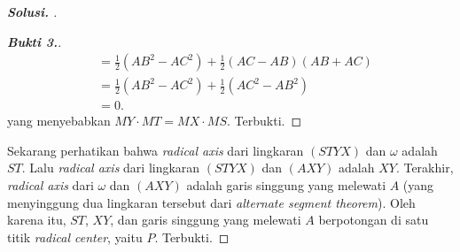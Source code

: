 \begin{proof}[\textbf{Solusi. }]
\begin{proof}[\textbf{Bukti 3.}]
\begin{align*}
            &= \frac12(AB^2-AC^2) + \frac12(AC-AB)(AB+AC)\\
            &= \frac12(AB^2-AC^2) + \frac12(AC^2-AB^2)\\
            &= 0.
        \end{align*}
        yang menyebabkan $MY \cdot MT = MX \cdot MS$. Terbukti.
    \end{proof} 
    Sekarang perhatikan bahwa \textit{radical axis} dari lingkaran $(STYX)$ dan $\omega$ adalah $ST$. 
    Lalu \textit{radical axis} dari lingkaran $(STYX)$ dan $(AXY)$ adalah $XY$. 
    Terakhir, \textit{radical axis} dari $\omega$ dan $(AXY)$ adalah garis singgung yang melewati $A$ (yang menyinggung dua lingkaran tersebut dari \textit{alternate segment theorem}).
    Oleh karena itu, $ST$, $XY$, dan garis singgung yang melewati $A$ berpotongan di satu titik \textit{radical center}, yaitu $P$. Terbukti.
\end{proof} 